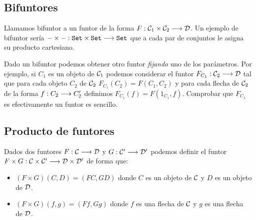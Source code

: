 \subsection{Bifuntores}
Llamamos bifuntor a un funtor de
la forma $F : \mathcal{C}_1\times\mathcal{C}_2\longrightarrow \mathcal{D}$. Un ejemplo de
bifuntor sería $-\times - : \texttt{Set}\times\texttt{Set}\longrightarrow \texttt{Set}$ que
a cada par de conjuntos le asigna su producto cartesiano.

Dado un bifuntor podemos obtener otro funtor \textit{fijando}
uno de los parámetros. Por ejemplo, si $C_1$ es un objeto de
$\mathcal{C}_1$ podemos considerar el funtor
$F_{C_1} : \mathcal{C}_2\longrightarrow \mathcal{D}$ tal que para cada objeto $C_2$ de $\mathcal{C}_2$
$F_{C_1}(C_2) = F(C_1, C_2)$ y para cada flecha de $\mathcal{C}_2$ de la forma
$f: C_2\longrightarrow C_2'$ definimos $F_{C_1}(f) = F(1_{C_1}, f)$. Comprobar
que $F_{C_1}$ es efectivamente un funtor es sencillo.

\subsection{Producto de funtores}
Dados dos funtores $F : \mathcal{C}\longrightarrow \mathcal{D}$ y $G: \mathcal{C}'\longrightarrow \mathcal{D}'$
podemos definir el funtor $F\times G: \mathcal{C}\times\mathcal{C}'\longrightarrow \mathcal{D}\times\mathcal{D}'$
de forma que:

\begin{itemize}
\item $(F\times G)(C, D) = (FC, GD)$ donde $C$ es un objeto
  de $\mathcal{C}$ y $D$ es un objeto de $\mathcal{D}$.
\item $(F\times G)(f, g) = (F f, G g)$ donde $f$ es una flecha
  de $\mathcal{C}$ y $g$ es una flecha de $\mathcal{D}$.
\end{itemize}




